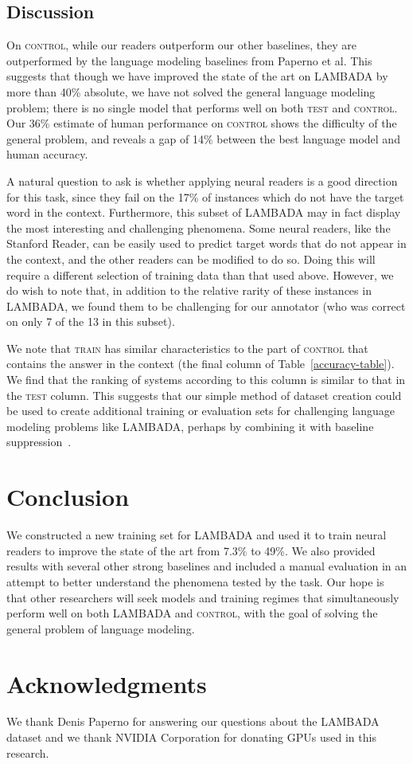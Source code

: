 \documentclass[11pt]{article}
\newcommand{\train}{\textsc{train}\xspace}
\newcommand{\control}{\textsc{control}\xspace}
\newcommand{\test}{\textsc{test}\xspace}
\begin{document}
\subsection{Discussion}

On \control, while our readers outperform our other baselines, they are outperformed by the language modeling baselines from Paperno et al. This suggests that though we have improved the state of the art on LAMBADA by more than 40\% absolute, we have not solved the general language modeling problem; there is no single model that performs well on both \test and \control. Our 36\% estimate of human performance on \control shows the difficulty of the general problem, and reveals a gap of 14\% between the best language model and human accuracy. 

A natural question to ask is whether applying neural readers is a good direction for this task, since they fail on the 17\% of instances which do not have the target word in the context. 
Furthermore, this subset of LAMBADA may in fact display the most interesting and challenging phenomena. 
Some neural readers, like the Stanford Reader, can be easily used to predict target words that do not appear in the context, and the other readers can be modified to do so. Doing this will require a different selection of training data than that used above. 
However, we do wish to note that, in addition to the relative rarity of these instances in LAMBADA, we found them to be challenging for our annotator (who was correct on only 7 of the 13 in this subset). 

We note that \train has similar characteristics to the part of \control that contains the answer in the context (the final column of Table~\ref{accuracy-table}). We find that the ranking of systems according to this column is similar to that in the \test column. This suggests that our simple method of dataset creation could be used to create additional training or evaluation sets for challenging language modeling problems like LAMBADA, perhaps by combining it with baseline suppression~\cite{onishi-16-full}. 

\section{Conclusion}

We constructed a new training set for LAMBADA and used it to train neural readers to improve the state of the art from 7.3\% to 49\%. We also provided results with several other strong baselines 
and included a manual evaluation in an attempt to better understand the phenomena tested by the task. Our hope is that other researchers will seek models and training regimes that simultaneously perform well on both LAMBADA and \control, with the goal of solving the general problem of language modeling. 

\section*{Acknowledgments}
We thank Denis Paperno for answering our questions about the LAMBADA dataset and we thank NVIDIA Corporation for donating GPUs used in this research.



\end{document}
